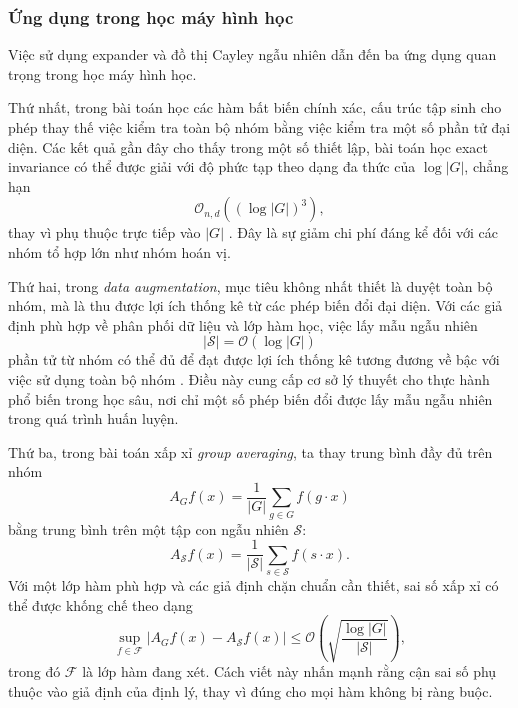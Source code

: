 \subsubsection{Ứng dụng trong học máy hình học}

Việc sử dụng expander và đồ thị Cayley ngẫu nhiên dẫn đến ba ứng dụng quan trọng trong học máy hình học.

Thứ nhất, trong bài toán học các hàm bất biến chính xác, cấu trúc tập sinh cho phép thay thế việc kiểm tra toàn bộ nhóm bằng việc kiểm tra một số phần tử đại diện. Các kết quả gần đây cho thấy trong một số thiết lập, bài toán học exact invariance có thể được giải với độ phức tạp theo dạng đa thức của $\log |G|$, chẳng hạn
\begin{equation}
    \mathcal{O}_{n,d}\left((\log |G|)^3\right),
    \label{eq:exact-invariance-complexity}
\end{equation}
thay vì phụ thuộc trực tiếp vào $|G|$ \cite{soleymani2025icml}. Đây là sự giảm chi phí đáng kể đối với các nhóm tổ hợp lớn như nhóm hoán vị.

Thứ hai, trong \textit{data augmentation}, mục tiêu không nhất thiết là duyệt toàn bộ nhóm, mà là thu được lợi ích thống kê từ các phép biến đổi đại diện. Với các giả định phù hợp về phân phối dữ liệu và lớp hàm học, việc lấy mẫu ngẫu nhiên
\begin{equation}
    |\mathcal{S}| = \mathcal{O}(\log |G|)
    \label{eq:augmentation-log-samples}
\end{equation}
phần tử từ nhóm có thể đủ để đạt được lợi ích thống kê tương đương về bậc với việc sử dụng toàn bộ nhóm \cite{tahmasebi2025aug}. Điều này cung cấp cơ sở lý thuyết cho thực hành phổ biến trong học sâu, nơi chỉ một số phép biến đổi được lấy mẫu ngẫu nhiên trong quá trình huấn luyện.

Thứ ba, trong bài toán xấp xỉ \textit{group averaging}, ta thay trung bình đầy đủ trên nhóm
\begin{equation}
    A_G f(x)
    =
    \frac{1}{|G|}
    \sum_{g \in G} f(g \cdot x)
    \label{eq:full-group-average}
\end{equation}
bằng trung bình trên một tập con ngẫu nhiên $\mathcal{S}$:
\begin{equation}
    A_{\mathcal{S}} f(x)
    =
    \frac{1}{|\mathcal{S}|}
    \sum_{s \in \mathcal{S}} f(s \cdot x).
    \label{eq:sampled-group-average}
\end{equation}
Với một lớp hàm phù hợp và các giả định chặn chuẩn cần thiết, sai số xấp xỉ có thể được khống chế theo dạng
\begin{equation}
    \sup_{f \in \mathcal{F}}
    \left|
        A_G f(x) - A_{\mathcal{S}} f(x)
    \right|
    \leq
    \mathcal{O}
    \left(
        \sqrt{
            \frac{\log |G|}{|\mathcal{S}|}
        }
    \right),
    \label{eq:approximate-group-averaging-bound}
\end{equation}
trong đó $\mathcal{F}$ là lớp hàm đang xét. Cách viết này nhấn mạnh rằng cận sai số phụ thuộc vào giả định của định lý, thay vì đúng cho mọi hàm không bị ràng buộc.

